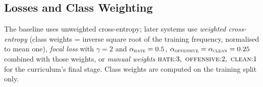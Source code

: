 \subsection{Losses and Class Weighting}
\label{sec:losses}
The baseline uses unweighted cross-entropy; later systems use \emph{weighted
cross-entropy} (class weights = inverse square root of the training frequency,
normalised to mean one), \emph{focal loss} \cite{lin2017focal} with $\gamma=2$ and
$\alpha_{\textsc{hate}}=0.5$,
$\alpha_{\textsc{offensive}}=\alpha_{\textsc{clean}}=0.25$ combined with those
weights, or \emph{manual weights} $\textsc{hate}{:}3,\ \textsc{offensive}{:}2,\
\textsc{clean}{:}1$ for the curriculum's final stage.  Class weights are computed
on the training split only.
